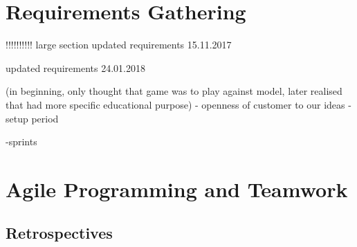 \documentclass{l3proj}
\begin{document}
\section{Requirements Gathering}
\label{sec:requirements}

!!!!!!!!!! large section
updated requirements 15.11.2017

updated requirements 24.01.2018


(in beginning, only thought that game was to play against model, later realised that had more specific educational purpose)
- openness of customer to our ideas
-setup period

-sprints


\section{Agile Programming and Teamwork}
\label{sec:agile}


\subsection*{Retrospectives}
\end{document}
